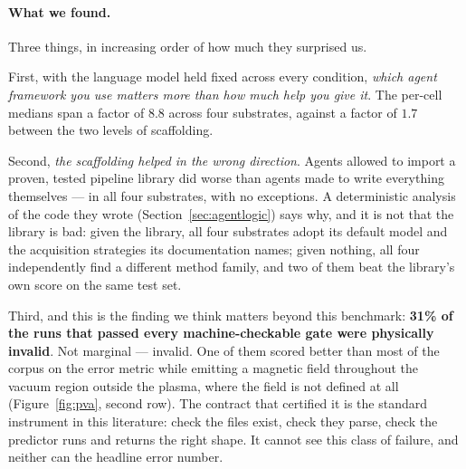 \paragraph{What we found.}
Three things, in increasing order of how much they surprised us.

First, with the language model held fixed across every condition, \emph{which
agent framework you use matters more than how much help you give it}. The
per-cell medians span a factor of $8.8$ across four substrates, against a factor
of $1.7$ between the two levels of scaffolding.

Second, \emph{the scaffolding helped in the wrong direction}. Agents allowed to
import a proven, tested pipeline library did worse than agents made to write
everything themselves --- in all four substrates, with no exceptions. A
deterministic analysis of the code they wrote (Section~\ref{sec:agentlogic})
says why, and it is not that the library is bad: given the library, all four
substrates adopt its default model and the acquisition strategies its
documentation names; given nothing, all four independently find a different
method family, and two of them beat the library's own score on the same test
set.

Third, and this is the finding we think matters beyond this benchmark:
\textbf{31\% of the runs that passed every machine-checkable gate were
physically invalid}. Not marginal --- invalid. One of them scored better than
most of the corpus on the error metric while emitting a magnetic field
throughout the vacuum region outside the plasma, where the field is not defined
at all (Figure~\ref{fig:pva}, second row). The contract that certified it is the
standard instrument in this literature: check the files exist, check they parse,
check the predictor runs and returns the right shape. It cannot see this class
of failure, and neither can the headline error number.

